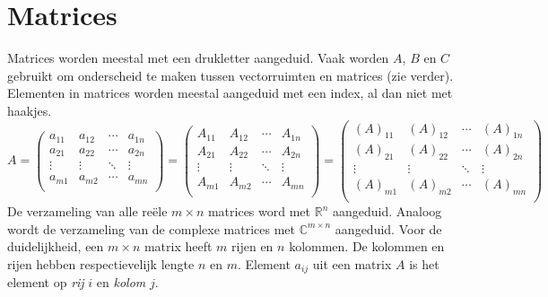 \documentclass[lineaire_algebra_oplossingen.tex]{subfiles}
\begin{document}
\section{Matrices}
Matrices worden meestal met een drukletter aangeduid.
Vaak worden $A$, $B$ en $C$ gebruikt om onderscheid te maken tussen vectorruimten en matrices (zie verder). Elementen in matrices worden meestal aangeduid met een index, al dan niet met haakjes.
\[
A = 
\begin{pmatrix}
a_{11} & a_{12} & \cdots & a_{1n}\\
a_{21} & a_{22} & \cdots & a_{2n}\\
\vdots & \vdots & \ddots & \vdots\\
a_{m1} & a_{m2} & \cdots & a_{mn}\\
\end{pmatrix}
= 
\begin{pmatrix}
A_{11} & A_{12} & \cdots & A_{1n}\\
A_{21} & A_{22} & \cdots & A_{2n}\\
\vdots & \vdots & \ddots & \vdots\\
A_{m1} & A_{m2} & \cdots & A_{mn}\\
\end{pmatrix}
=
\begin{pmatrix}
(A)_{11} & (A)_{12} & \cdots & (A)_{1n}\\
(A)_{21} & (A)_{22} & \cdots & (A)_{2n}\\
\vdots & \vdots & \ddots & \vdots\\
(A)_{m1} & (A)_{m2} & \cdots & (A)_{mn}\\
\end{pmatrix}
\]
De verzameling van alle re\"ele $m\times n$ matrices word met $\mathbb{R}^n$ aangeduid.
Analoog wordt de verzameling van de complexe matrices met $\mathbb{C}^{m\times n}$ aangeduid.
Voor de duidelijkheid, een $m \times n$ matrix heeft $m$ rijen en $n$ kolommen.
De kolommen en rijen hebben respectievelijk lengte $n$ en $m$.
Element $a_{ij}$ uit een matrix $A$ is het element op \emph{rij} $i$ en \emph{kolom} $j$.
\end{document}
